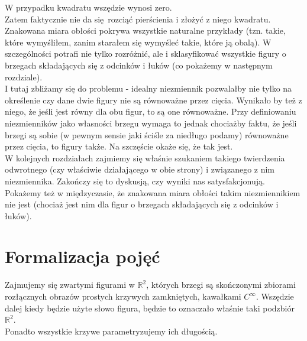 \documentclass[a4paper, 12pt, twosided]{article}
\begin{document}
W przypadku kwadratu wszędzie wynosi zero. \\
Zatem faktycznie nie da się rozciąć pierścienia i złożyć z niego kwadratu. \\
Znakowana miara obłości pokrywa wszystkie naturalne przykłady (tzn. takie, które wymyśliłem, zanim 
starałem
się wymyśleć takie, które ją obalą). W szczególności potrafi nie tylko rozróżnić, ale i 
sklasyfikować
wszystkie figury o brzegach składających się z odcinków i łuków (co pokażemy w następnym 
rozdziale). \\
I tutaj zbliżamy się do problemu - idealny niezmiennik pozwalałby nie tylko na określenie czy dane 
dwie figury nie są równoważne przez cięcia. Wynikało by też z niego, że jeśli jest równy dla obu 
figur, to są one równoważne. Przy definiowaniu niezmienników jako własności 
brzegu wymaga to jednak chociażby
faktu, że jeśli brzegi są sobie (w pewnym sensie jaki ściśle za niedługo podamy) równoważne przez 
cięcia,
to figury także. Na szczęście okaże się, że tak jest. \\
W kolejnych rozdziałach zajmiemy się właśnie szukaniem takiego twierdzenia odwrotnego (czy właściwie
działającego w obie strony) i związanego z nim niezmiennika. Zakończy się to dyskusją, czy wyniki 
nas
satysfakcjonują. \\
Pokażemy też w międzyczasie, że znakowana miara obłości takim niezmiennikiem nie jest (chociaż jest 
nim
dla figur o brzegach składających się z odcinków i łuków).
\section{Formalizacja pojęć}
Zajmujemy się zwartymi figurami w $\mathbb{R}^2$, których brzegi są skończonymi zbiorami 
 rozłącznych 
obrazów
prostych krzywych
zamkniętych, kawałkami $C^\infty$.
Wszędzie dalej kiedy będzie użyte słowo figura, będzie to oznaczało właśnie taki podzbiór 
$\mathbb{R}
^2$. \\
Ponadto wszystkie krzywe parametryzujemy ich długością.
\end{document}
